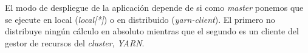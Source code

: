 El modo de despliegue de la aplicación depende de si como \textit{master} ponemos que se ejecute en local 
(\textit{local[*]}) o en distribuido (\textit{yarn-client}). El primero no distribuye ningún cálculo en absoluto
mientras que el segundo es un cliente del gestor de recursos del \textit{cluster}, \textit{YARN}.

\newpage